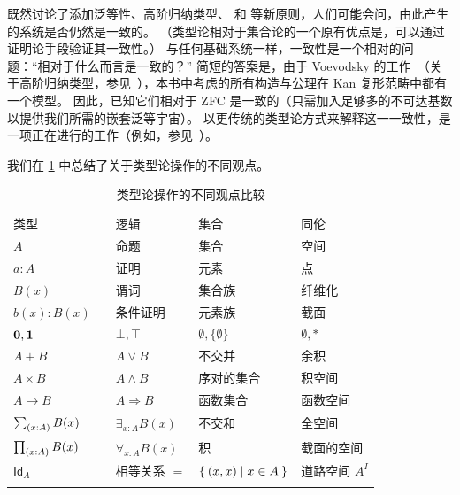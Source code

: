 既然讨论了添加泛等性、高阶归纳类型、\choice{} 和 \LEM{} 等新原则，人们可能会问，由此产生的系统是否仍然是一致的。
（类型论相对于集合论的一个原有优点是，可以通过证明论手段验证其一致性。）
与任何基础系统一样，一致性是一个相对的问题：``相对于什么而言是一致的？''
简短的答案是，由于 Voevodsky 的工作~\cite{klv:ssetmodel}（关于高阶归纳类型，参见~\cite{ls:hits}），本书中考虑的所有构造与公理在 Kan 复形范畴中都有一个模型。
因此，已知它们相对于 ZFC 是一致的（只需加入足够多的不可达基数
%
以提供我们所需的嵌套泛等宇宙）。
以更传统的类型论方式来解释这一一致性，是一项正在进行的工作（例如，参见~\cite{lh:canonicity,coquand2012constructive}）。

我们在 \cref{tab:pov} 中总结了关于类型论操作的不同观点。

\begin{table}[htb]
  \centering
  \OPTsmalltable
 \begin{tabular}{lllll}
    \toprule
       类型 && 逻辑 & 集合 & 同伦\\ \addlinespace[2pt]
    \midrule
       $A$ && 命题 & 集合 & 空间\\ \addlinespace[2pt]
       $a:A$ && 证明 & 元素 & 点 \\ \addlinespace[2pt]
       $B(x)$ && 谓词 & 集合族 & 纤维化 \\ \addlinespace[2pt]
       $b(x) : B(x)$ && 条件证明 & 元素族 & 截面\\ \addlinespace[2pt]
       $\mathbf{0}, \mathbf{1}$ && $\bot, \top$ & $\emptyset, \{ \emptyset \}$ & $\emptyset, *$\\ \addlinespace[2pt]
       $A + B$ && $A\vee B$ & 不交并 & 余积\\ \addlinespace[2pt]
       $A\times B$ && $A\wedge B$ & 序对的集合 & 积空间\\ \addlinespace[2pt]
       $A\to B$ && $A\Rightarrow B$ & 函数集合 & 函数空间\\ \addlinespace[2pt]
       $\sm{x:A}B(x)$ &&  $\exists_{x:A}B(x)$ & 不交和 & 全空间\\ \addlinespace[2pt]
       $\prd{x:A}B(x)$ &&  $\forall_{x:A}B(x)$ & 积 & 截面的空间\\ \addlinespace[2pt]
       $\mathsf{Id}_{A}$ && 相等关系 $=$ & $\Set{{\mathopen{}(x,x)\mathclose{}} | x\in A}$ & 道路空间 $A^I$ \\ \addlinespace[2pt]
    \bottomrule
  \end{tabular}
  \caption{类型论操作的不同观点比较}\label{tab:pov}
\end{table}

